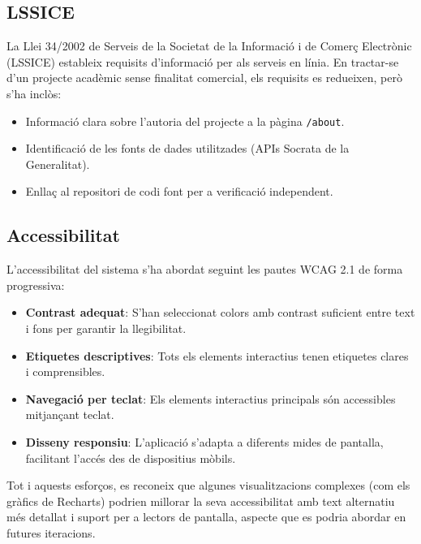 \subsection{LSSICE}

La Llei 34/2002 de Serveis de la Societat de la Informació i de Comerç Electrònic (LSSICE) estableix requisits d'informació per als serveis en línia. En tractar-se d'un projecte acadèmic sense finalitat comercial, els requisits es redueixen, però s'ha inclòs:

\begin{itemize}
    \item Informació clara sobre l'autoria del projecte a la pàgina \texttt{/about}.
    \item Identificació de les fonts de dades utilitzades (APIs Socrata de la Generalitat).
    \item Enllaç al repositori de codi font per a verificació independent.
\end{itemize}

\subsection{Accessibilitat}

L'accessibilitat del sistema s'ha abordat seguint les pautes WCAG 2.1 de forma progressiva:

\begin{itemize}
    \item \textbf{Contrast adequat}: S'han seleccionat colors amb contrast suficient entre text i fons per garantir la llegibilitat.
    \item \textbf{Etiquetes descriptives}: Tots els elements interactius tenen etiquetes clares i comprensibles.
    \item \textbf{Navegació per teclat}: Els elements interactius principals són accessibles mitjançant teclat.
    \item \textbf{Disseny responsiu}: L'aplicació s'adapta a diferents mides de pantalla, facilitant l'accés des de dispositius mòbils.
\end{itemize}

Tot i aquests esforços, es reconeix que algunes visualitzacions complexes (com els gràfics de Recharts) podrien millorar la seva accessibilitat amb text alternatiu més detallat i suport per a lectors de pantalla, aspecte que es podria abordar en futures iteracions.


